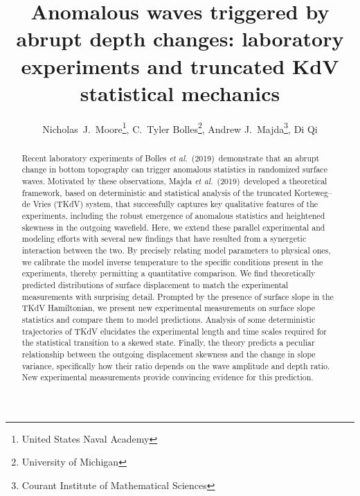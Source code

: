 \documentclass[11pt]{article}
\newcommand{\new}[1]{{ #1}}
\newcommand{\boetal}{Bolles {\it et al.}~(2019)~}
\newcommand{\maetal}{Majda {\it et al.}~(2019)~}
\begin{document}
\title{Anomalous waves triggered by abrupt depth changes: laboratory experiments and truncated KdV statistical mechanics}

\author{
Nicholas~J.~Moore\thanks{United States Naval Academy}, 
C.~Tyler Bolles\thanks{University of Michigan},
Andrew J.~Majda\thanks{Courant Institute of Mathematical Sciences}, 
Di Qi\footnotemark[3] }
\maketitle

\begin{abstract} 
Recent laboratory experiments of \boetal demonstrate that an abrupt change in bottom topography can trigger anomalous statistics in randomized surface waves. Motivated by these observations, \maetal developed a theoretical framework, based on deterministic and statistical analysis of the truncated Korteweg–de Vries (TKdV) system, that successfully captures key qualitative features of the experiments, including the robust emergence of anomalous statistics and heightened skewness in the outgoing wavefield. Here, we extend these parallel experimental and modeling efforts with several new findings that have resulted from a synergetic interaction between the two. By precisely relating model parameters to physical ones, we calibrate the model inverse temperature to the specific conditions present in the experiments, thereby permitting a quantitative comparison. We find theoretically predicted distributions of surface displacement to match the experimental measurements with surprising detail. Prompted by the presence of surface slope in the TKdV Hamiltonian, we present new experimental measurements on surface slope statistics and compare them to model predictions. Analysis of some deterministic trajectories of TKdV elucidates the experimental length and time scales required for the statistical transition to a skewed state. Finally, the theory predicts a peculiar relationship between the outgoing displacement skewness and the change in slope variance, specifically how their ratio depends on the wave amplitude and depth ratio. \new{New experimental measurements provide convincing evidence for this prediction.}
\end{abstract}


\end{document}
